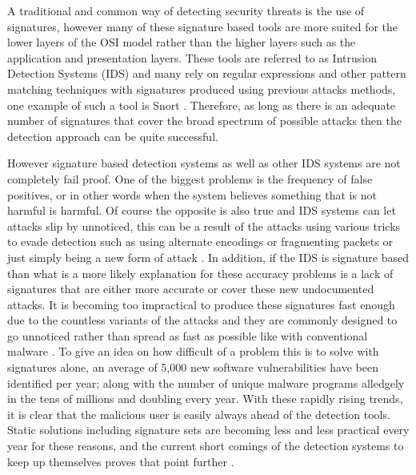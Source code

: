 A traditional and common way of detecting security threats is the use of signatures, however many of these signature based tools are more suited for the lower layers of the OSI model rather than the higher layers such as the application and presentation layers.  These tools are referred to as Intrusion Detection Systems (IDS) and many rely on regular expressions and other pattern matching techniques with signatures produced using previous attacks methods, one example of such a tool is Snort \cite{mainPaper}.  Therefore, as long as there is an adequate number of signatures that cover the broad spectrum of possible attacks then the detection approach can be quite successful.  

However signature based detection systems as well as other IDS systems are not completely fail proof.  One of the biggest problems is the frequency of false positives, or in other words when the system believes something that is not harmful is harmful.  Of course the opposite is also true and IDS systems can let attacks slip by unnoticed, this can be a result of the attacks using various tricks to evade detection such as using alternate encodings or fragmenting packets or just simply being a new form of attack \cite{onTheVerification}.  In addition, if the IDS is signature based than what is a more likely explanation for these accuracy problems is a lack of signatures that are either more accurate or cover these new undocumented attacks.  It is becoming too impractical to produce these signatures fast enough due to the countless variants of the attacks and they are commonly designed to go unnoticed rather than spread as fast as possible like with conventional malware \cite{trendMicro}.  To give an idea on how difficult of a problem this is to solve with signatures alone, an average of 5,000 new software vulnerabilities have been identified per year; along with the number of unique malware programs alledgely in the tens of millions and doubling every year.  With these rapidly rising trends, it is clear that the malicious user is easily always ahead of the detection tools.  Static solutions including signature sets are becoming less and less practical every year for these reasons, and the current short comings of the detection systems to keep up themselves proves that point further \cite{onTheVerification}.

